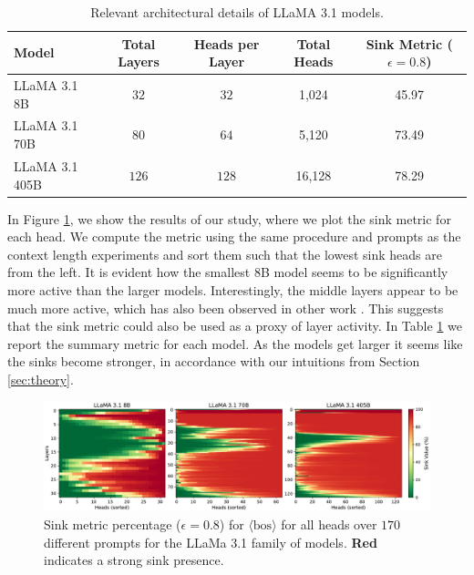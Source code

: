 \documentclass{article} %
\newcommand{\bos}{\ensuremath{\langle\text{bos}\rangle}\xspace}
\begin{document}
\begin{table}[h]
    \centering
    \begin{tabular}{lcccc}
        \toprule
        \textbf{Model} & \textbf{Total Layers} & \textbf{Heads per Layer} & \textbf{Total Heads} & \textbf{Sink Metric ($\epsilon=0.8$}) \\
        \midrule
        LLaMA 3.1 8B   & $32$   & $32$  & 1{\textnormal{,}}024 & 45.97 \\
        LLaMA 3.1 70B  & $80$   & $64$  & 5{\textnormal{,}}120 & 73.49 \\
        LLaMA 3.1 405B & $126$  & $128$ & 16{\textnormal{,}}128 & 78.29 \\
        \bottomrule
    \end{tabular}
    \caption{Relevant architectural details of LLaMA 3.1 models.}
    \label{tab:llama3_1_specs}
\end{table}

In Figure \ref{fig:llama_heatmaps}, we show the results of our study, where we plot the sink metric for each head. We compute the metric using the same procedure and prompts as the context length experiments and sort them such that the lowest sink heads are from the left. It is evident how the smallest 8B model seems to be significantly more active than the larger models. Interestingly, the middle layers appear to be much more active, which has also been observed in other work \citep{skean2025layer}. This suggests that the sink metric could also be used as a proxy of layer activity. In Table \ref{tab:llama3_1_specs} we report the summary metric for each model. As the models get larger it seems like the sinks become stronger, in accordance with our intuitions from Section \ref{sec:theory}. 

\begin{figure}[h]
  \centering
  \includegraphics[width=\textwidth]{figures/llama-heatmaps.pdf}
  \caption{Sink metric percentage ($\epsilon = 0.8$) for \bos for all  heads over $170$ different prompts for the LLaMa 3.1 family of models. \textcolor{mymauve}{\bf Red} indicates a strong sink presence.}
  \label{fig:llama_heatmaps}
\end{figure}
\end{document}
